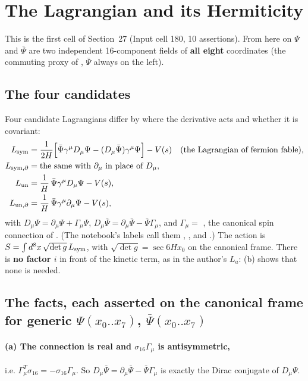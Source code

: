 \section{The Lagrangian and its Hermiticity}
\label{sec:4}

This is the first cell of Section~27 (Input cell 180, 10 assertions). From here on $\Psi$ and
$\bar\Psi$ are two independent 16-component fields of \textbf{all eight} coordinates (the commuting
proxy of , $\bar\Psi$ always on the left).

\subsection{The four candidates}
\label{sec:4.1}

Four candidate Lagrangians differ by where the derivative acts and whether it is covariant:
\begin{align*}
  L_{\mathrm{sym}} &= \frac{1}{2H}\Bigl[\bar\Psi\gamma^\mu D_\mu\Psi-(D_\mu\bar\Psi)\gamma^\mu\Psi\Bigr]-V(s)
          &&\text{(the Lagrangian of fermion fable)},\\
  L_{\mathrm{sym},\partial} &= \text{the same with } \partial_\mu \text{ in place of } D_\mu,\\
  L_{\mathrm{un}} &= \frac1H\,\bar\Psi\gamma^\mu D_\mu\Psi-V(s),\\
  L_{\mathrm{un},\partial} &= \frac1H\,\bar\Psi\gamma^\mu\partial_\mu\Psi-V(s),
\end{align*}
with $D_\mu\Psi=\partial_\mu\Psi+\Gamma_\mu\Psi$, $D_\mu\bar\Psi=\partial_\mu\bar\Psi-\bar\Psi\Gamma_\mu$,
and $\Gamma_\mu=$ , the canonical spin connection of
. (The notebook's labels call them , ,  and
.) The action is $S=\int d^8x\,\sqrt{\det g}\,L_{\mathrm{sym}}$, with
$\sqrt{\det g}=\sec 6Hx_0$ on the canonical frame. There is \textbf{no factor $i$} in front of the
kinetic term, as in the author's $L_a$: (b) shows that none is needed.

\subsection{The facts, each asserted on the canonical frame for generic \texorpdfstring{$\Psi(x_0..x_7)$, $\bar\Psi(x_0..x_7)$}{Psi(x0..x7), Psibar(x0..x7)}}
\label{sec:4.2}

\paragraph{(a) The connection is real and $\sigma_{16}\Gamma_\mu$ is antisymmetric,} i.e.
$\Gamma_\mu^{T}\sigma_{16}=-\sigma_{16}\Gamma_\mu$. So $D_\mu\bar\Psi=\partial_\mu\bar\Psi-\bar\Psi\Gamma_\mu$
is exactly the Dirac conjugate of $D_\mu\Psi$. 

